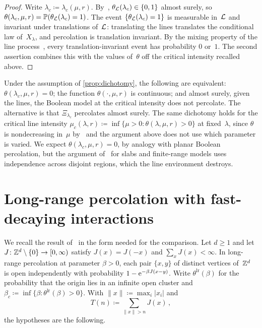 \documentclass[11pt,letterpaper]{article}
\begin{document}
\begin{proof}
Write $\lambda_c\coloneqq\lambda_c(\mu,r)$. By~\cite[Proposition~3.3]{HJ26sub}, $\theta_\mathcal L(\lambda_c)\in\{0,1\}$ almost surely, so $\theta(\lambda_c,\mu,r)=\mathbb P(\theta_\mathcal L(\lambda_c)=1)$. The event $\{\theta_\mathcal L(\lambda_c)=1\}$ is measurable in~$\mathcal L$ and invariant under translations of~$\mathcal L$: translating the lines translates the conditional law of~$X_\lambda$, and percolation is translation invariant. By the mixing property of the line process~\cite[Lemma~3.2]{HJ26sub}, every translation-invariant event has probability $0$ or~$1$. The second assertion combines this with the values of~$\theta$ off the critical intensity recalled above.
\end{proof}

\begin{remark}
\label{rem:question}
Under the assumption of \cref{prop:dichotomy}, the following are equivalent: $\theta(\lambda_c,\mu,r)=0$; the function $\theta(\cdot,\mu,r)$ is continuous; and almost surely, given the lines, the Boolean model at the critical intensity does not percolate. The alternative is that $\Xi_{\lambda_c}$ percolates almost surely. The same dichotomy holds for the critical line intensity $\mu_c(\lambda,r)\coloneqq\inf\{\mu>0\colon\theta(\lambda,\mu,r)>0\}$ at fixed~$\lambda$, since $\theta$ is nondecreasing in~$\mu$ by~\cite[Proposition~3.1]{HJ26sub} and the argument above does not use which parameter is varied. We expect $\theta(\lambda_c,\mu,r)=0$, by analogy with planar Boolean percolation, but the argument of~\cite{DST16} for slabs and finite-range models uses independence across disjoint regions, which the line environment destroys.
\end{remark}

\section{Long-range percolation with fast-decaying interactions}
\label{sec:longrange}

We recall the result of~\cite{Pei26} in the form needed for the comparison. Let $d\ge1$ and let $J\colon\mathbb Z^d\setminus\{0\}\to[0,\infty)$ satisfy $J(x)=J(-x)$ and $\sum_xJ(x)<\infty$. In long-range percolation at parameter $\beta>0$, each pair $\{x,y\}$ of distinct vertices of~$\mathbb Z^d$ is open independently with probability $1-\mathrm{e}^{-\beta J(x-y)}$. Write $\theta^{\mathrm{lr}}(\beta)$ for the probability that the origin lies in an infinite open cluster and $\beta_c\coloneqq\inf\{\beta\colon\theta^{\mathrm{lr}}(\beta)>0\}$. With $\lVert x\rVert\coloneqq\max_i\lvert x_i\rvert$ and
\begin{equation*}
  T(n)\coloneqq\sum_{\lVert x\rVert>n}J(x)\,,
\end{equation*}
the hypotheses are the following.
\end{document}
